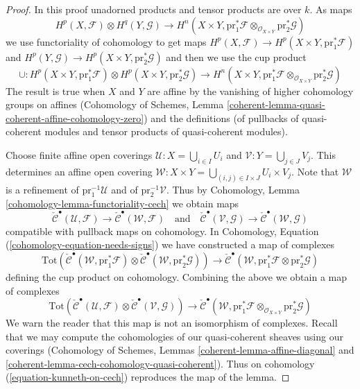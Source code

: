 \begin{proof}
In this proof unadorned products and tensor products are over $k$. As maps
$$
H^p(X, \mathcal{F}) \otimes H^q(Y, \mathcal{G})
\longrightarrow
H^n(X \times Y, \text{pr}_1^*\mathcal{F}
\otimes_{\mathcal{O}_{X \times Y}} \text{pr}_2^*\mathcal{G})
$$
we use functoriality of cohomology to get maps
$H^p(X, \mathcal{F}) \to H^p(X \times Y, \text{pr}_1^*\mathcal{F})$ and
$H^p(Y, \mathcal{G}) \to H^p(X \times Y, \text{pr}_2^*\mathcal{G})$
and then we use the cup product
$$
\cup :
H^p(X \times Y, \text{pr}_1^*\mathcal{F})
\otimes H^p(X \times Y, \text{pr}_2^*\mathcal{G})
\longrightarrow
H^n(X \times Y, \text{pr}_1^*\mathcal{F}
\otimes_{\mathcal{O}_{X \times Y}} \text{pr}_2^*\mathcal{G})
$$
The result is true when $X$ and $Y$ are affine by the vanishing of
higher cohomology groups on affines (Cohomology of Schemes, Lemma
\ref{coherent-lemma-quasi-coherent-affine-cohomology-zero})
and the definitions (of pullbacks of quasi-coherent modules and tensor
products of quasi-coherent modules).

\medskip\noindent
Choose finite affine open coverings
$\mathcal{U} : X = \bigcup_{i \in I} U_i$ and
$\mathcal{V} : Y = \bigcup_{j \in J} V_j$.
This determines an affine open covering
$\mathcal{W} : X \times Y = \bigcup_{(i, j) \in I \times J} U_i \times V_j$.
Note that $\mathcal{W}$ is a refinement of
$\text{pr}_1^{-1}\mathcal{U}$ and of $\text{pr}_2^{-1}\mathcal{V}$.
Thus by Cohomology, Lemma \ref{cohomology-lemma-functoriality-cech}
we obtain maps
$$
\check{\mathcal{C}}^\bullet(\mathcal{U}, \mathcal{F}) \to
\check{\mathcal{C}}^\bullet(\mathcal{W}, \mathcal{F})
\quad\text{and}\quad
\check{\mathcal{C}}^\bullet(\mathcal{V}, \mathcal{G}) \to
\check{\mathcal{C}}^\bullet(\mathcal{W}, \mathcal{G})
$$
compatible with pullback maps on cohomology. In Cohomology, Equation
(\ref{cohomology-equation-needs-signs})
we have constructed a map of complexes
$$
\text{Tot}(
\check{\mathcal{C}}^\bullet(\mathcal{W}, \text{pr}_1^*\mathcal{F})
\otimes
\check{\mathcal{C}}^\bullet(\mathcal{W}, \text{pr}_2^*\mathcal{G}))
\longrightarrow
\check{\mathcal{C}}^\bullet(\mathcal{W},
\text{pr}_1^*\mathcal{F} \otimes \text{pr}_2^*\mathcal{G})
$$
defining the cup product on cohomology. Combining the above we
obtain a map of complexes
\begin{equation}
\label{equation-kunneth-on-cech}
\text{Tot}(
\check{\mathcal{C}}^\bullet(\mathcal{U}, \mathcal{F})
\otimes
\check{\mathcal{C}}^\bullet(\mathcal{V}, \mathcal{G}))
\longrightarrow
\check{\mathcal{C}}^\bullet(\mathcal{W},
\text{pr}_1^*\mathcal{F} \otimes_{\mathcal{O}_{X \times Y}}
\text{pr}_2^*\mathcal{G})
\end{equation}
We warn the reader that this map is not an isomorphism of
complexes. Recall that we may compute the cohomologies of our
quasi-coherent sheaves using our coverings
(Cohomology of Schemes, Lemmas
\ref{coherent-lemma-affine-diagonal} and
\ref{coherent-lemma-cech-cohomology-quasi-coherent}).
Thus on cohomology (\ref{equation-kunneth-on-cech}) reproduces the map of
the lemma.


\end{proof}
